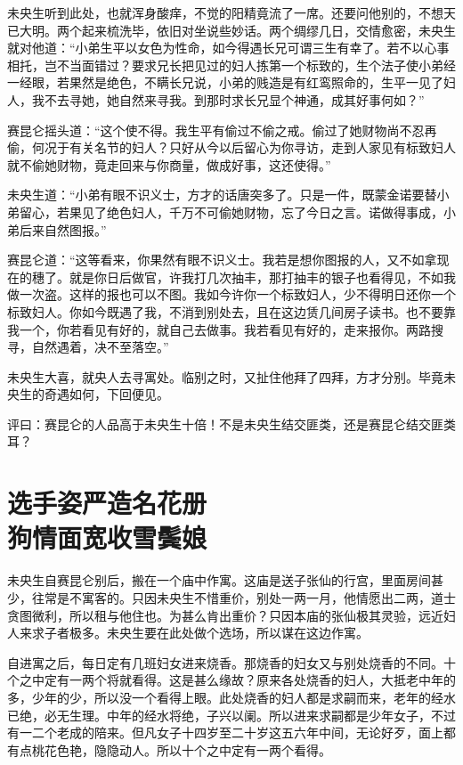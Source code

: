 \documentclass[a4paper,12pt,UTF8,twoside]{ctexbook}
\begin{document}
未央生听到此处，也就浑身酸痒，不觉的阳精竟流了一席。还要问他别的，不想天已大明。两个起来梳洗毕，依旧对坐说些妙话。两个绸缪几日，交情愈密，未央生就对他道：“小弟生平以女色为性命，如今得遇长兄可谓三生有幸了。若不以心事相托，岂不当面错过？要求兄长把见过的妇人拣第一个标致的，生个法子使小弟经一经眼，若果然是绝色，不瞒长兄说，小弟的贱造是有红鸾照命的，生平一见了妇人，我不去寻她，她自然来寻我。到那时求长兄显个神通，成其好事何如？”

赛昆仑摇头道：“这个使不得。我生平有偷过不偷之戒。偷过了她财物尚不忍再偷，何况于有关名节的妇人？只好从今以后留心为你寻访，走到人家见有标致妇人就不偷她财物，竟走回来与你商量，做成好事，这还使得。”

未央生道：“小弟有眼不识义士，方才的话唐突多了。只是一件，既蒙金诺要替小弟留心，若果见了绝色妇人，千万不可偷她财物，忘了今日之言。诺做得事成，小弟后来自然图报。”

赛昆仑道：“这等看来，你果然有眼不识义士。我若是想你图报的人，又不如拿现在的穗了。就是你日后做官，许我打几次抽丰，那打抽丰的银子也看得见，不如我做一次盗。这样的报也可以不图。我如今许你一个标致妇人，少不得明日还你一个标致妇人。你如今既遇了我，不消到别处去，且在这边赁几间房子读书。也不要靠我一个，你若看见有好的，就自己去做事。我若看见有好的，走来报你。两路搜寻，自然遇着，决不至落空。”

未央生大喜，就央人去寻寓处。临别之时，又扯住他拜了四拜，方才分别。毕竟未央生的奇遇如何，下回便见。

评曰：赛昆仑的人品高于未央生十倍！不是未央生结交匪类，还是赛昆仑结交匪类耳？

\chapter[选手姿严造名花册\ 狗情面宽收雪鬓娘]{选手姿严造名花册\\狗情面宽收雪鬓娘}

未央生自赛昆仑别后，搬在一个庙中作寓。这庙是送子张仙的行宫，里面房间甚少，往常是不寓客的。只因未央生不惜重价，别处一两一月，他情愿出二两，道士贪图微利，所以租与他住也。为甚么肯出重价？只因本庙的张仙极其灵验，远近妇人来求子者极多。未央生要在此处做个选场，所以谋在这边作寓。

自进寓之后，每日定有几班妇女进来烧香。那烧香的妇女又与别处烧香的不同。十个之中定有一两个将就看得。这是甚么缘故？原来各处烧香的妇人，大抵老中年的多，少年的少，所以没一个看得上眼。此处烧香的妇人都是求嗣而来，老年的经水已绝，必无生理。中年的经水将绝，子兴以阑。所以进来求嗣都是少年女子，不过有一二个老成的陪来。但凡女子十四岁至二十岁这五六年中间，无论好歹，面上都有点桃花色艳，隐隐动人。所以十个之中定有一两个看得。
\end{document}
